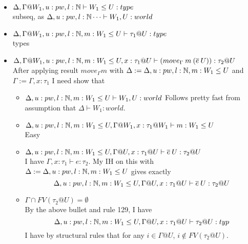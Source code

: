 \documentclass{article}
\begin{document}
 \begin{itemize}
     \item $\Delta, \Gamma@W_1, u: pw, l: \N \vdash W_1 \leq U: type$\\
     subseq, as $\Delta,  u: pw, l : \mathbb{N} \dots \vdash W_1, U : world$
     \item $\Delta, \Gamma@W_1, u: pw, l : \N, m: W_1 \leq U \vdash \tau_1@U: type$\\
     types
     \item $\Delta, \Gamma@W_1, u: pw, l : \N, m: W_1 \leq U, x: \tau_1 @ U \vdash (move_{\Gamma}\:m\:(\overline{e} \: U)) : \tau_2@U$\\
     After applying result $move_{\Gamma}m$ with $\Delta := \Delta, u: pw, l: \mathbb{N}, m: W_1 \leq U$ and $\Gamma := \Gamma, x: \tau_1$
     I need show that
     \begin{itemize}
         \item $\Delta, u: pw, l: \mathbb{N}, m: W_1 \leq U \vdash W_1, U : world$
         Follows pretty fast from assumption that $\Delta \vdash W_1 : world$.
         \item $\Delta, u: pw, l: \mathbb{N}, m: W_1 \leq U, \Gamma @ W_1, x: \tau_1 @W_1 \vdash m : W_1 \leq U$\\
         Easy
         \item $\Delta, u: pw, l: \mathbb{N}, m: W_1 \leq U, \Gamma @ 
         U, x: \tau_1 @U \vdash \overline{e} \: U : \tau_2 @ U$\\
         I have $\Gamma, x: \tau_1 \vdash e : \tau_2$. My IH on this with $\Delta := \Delta, u: pw, l: \mathbb{N}, m: W_1 \leq U$ gives exactly
         \[\Delta, u: pw, l: \mathbb{N}, m: W_1 \leq U, \Gamma @ U, x: \tau_1 @U \vdash  \overline{e} \: U : \tau_2 @ U \]
         \item $\Gamma \cap FV(\tau_2 @ U) = \emptyset$\\
    By the above bullet and rule 129, I have 
    \[\Delta, u: pw, l: \mathbb{N}, m: W_1 \leq U, \Gamma @ U, x:\tau_1 @U \vdash  \tau_2 @ U: typ
    \]
         I have by structural rules that for any $i \in  \Gamma @ U$, $i \notin FV(\tau_2 @ U)$.
     \end{itemize}
 \end{itemize}
 
\end{document}
